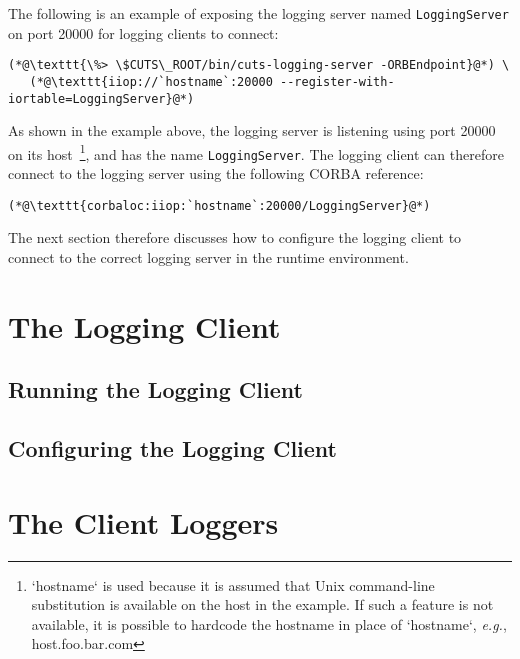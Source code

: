 The following is an example of exposing the logging server named
\texttt{LoggingServer} on port 20000 for logging clients to connect:
\begin{lstlisting}
(*@\texttt{\%> \$CUTS\_ROOT/bin/cuts-logging-server -ORBEndpoint}@*) \
   (*@\texttt{iiop://`hostname`:20000 --register-with-iortable=LoggingServer}@*)
\end{lstlisting}
As shown in the example above, the logging server is listening using
port 20000 on its host~\footnote{`hostname` is used because it is assumed
that Unix command-line substitution is available on the host in the 
example. If such a feature is not available, it is possible to hardcode 
the hostname in place of `hostname`, \textit{e.g.}, host.foo.bar.com}, 
and has the name \texttt{LoggingServer}. The logging client can 
therefore connect to the logging server using the following CORBA 
reference: 
\begin{lstlisting}
(*@\texttt{corbaloc:iiop:`hostname`:20000/LoggingServer}@*)
\end{lstlisting}
The next section therefore discusses how to configure the logging 
client to connect to the correct logging server in the runtime 
environment.

\section{The Logging Client}
\label{sec:logging-client}

\subsection{Running the Logging Client}

\subsection{Configuring the Logging Client}

\section{The Client Loggers}
\label{sec:client-loggers}
